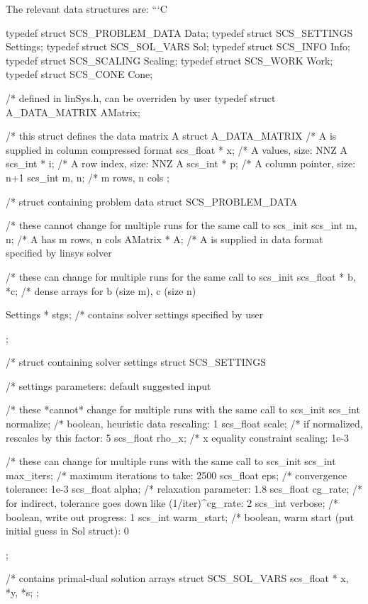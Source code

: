 The relevant data structures are\-: ```\-C \begin{DoxyVerb}typedef struct SCS_PROBLEM_DATA Data;
typedef struct SCS_SETTINGS Settings;
typedef struct SCS_SOL_VARS Sol;
typedef struct SCS_INFO Info;
typedef struct SCS_SCALING Scaling;
typedef struct SCS_WORK Work;
typedef struct SCS_CONE Cone;

/* defined in linSys.h, can be overriden by user 
typedef struct A_DATA_MATRIX AMatrix;

/* this struct defines the data matrix A 
struct A_DATA_MATRIX {
    /* A is supplied in column compressed format 
    scs_float * x;      /* A values, size: NNZ A 
    scs_int * i;        /* A row index, size: NNZ A 
    scs_int * p;        /* A column pointer, size: n+1 
    scs_int m, n;       /* m rows, n cols 
};

/* struct containing problem data 
struct SCS_PROBLEM_DATA {
    /* these cannot change for multiple runs for the same call to scs_init 
    scs_int m, n;       /* A has m rows, n cols 
    AMatrix * A;        /* A is supplied in data format specified by linsys solver 

    /* these can change for multiple runs for the same call to scs_init 
    scs_float * b, *c;  /* dense arrays for b (size m), c (size n) 

    Settings * stgs;    /* contains solver settings specified by user 
};

/* struct containing solver settings 
struct SCS_SETTINGS {
    /* settings parameters: default suggested input 

    /* these *cannot* change for multiple runs with the same call to scs_init 
    scs_int normalize;  /* boolean, heuristic data rescaling: 1 
    scs_float scale;    /* if normalized, rescales by this factor: 5 
    scs_float rho_x;    /* x equality constraint scaling: 1e-3 

    /* these can change for multiple runs with the same call to scs_init 
    scs_int max_iters;  /* maximum iterations to take: 2500 
    scs_float eps;      /* convergence tolerance: 1e-3 
    scs_float alpha;    /* relaxation parameter: 1.8 
    scs_float cg_rate;  /* for indirect, tolerance goes down like (1/iter)^cg_rate: 2 
    scs_int verbose;    /* boolean, write out progress: 1 
    scs_int warm_start; /* boolean, warm start (put initial guess in Sol struct): 0 
};   

/* contains primal-dual solution arrays 
struct SCS_SOL_VARS {
    scs_float * x, *y, *s;
};


\end{DoxyVerb}

